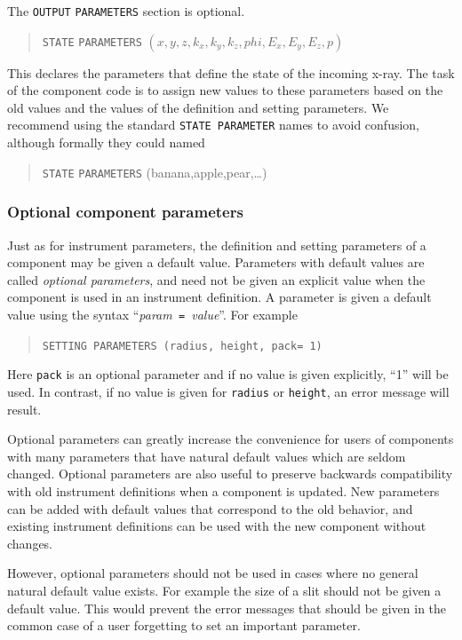 The \texttt{OUTPUT} \texttt{PARAMETERS} section is optional.

\begin{quote}
  \texttt{STATE} \texttt{PARAMETERS} $(x,y,z,k_x,k_y,k_z,phi,E_x,E_y,E_z,p)$
\end{quote}
This declares the parameters that define the state of the incoming
x-ray. The task of the component code is to assign new values to these
parameters based on the old values and the values of the definition and
setting parameters. 
We recommend using the standard \texttt{STATE PARAMETER} names to avoid confusion, although formally they could named
\begin{quote}
  \texttt{STATE} \texttt{PARAMETERS} (banana,apple,pear,\ldots)
\end{quote}

\subsubsection{Optional component parameters}

Just as for instrument parameters, the definition and setting parameters of a
component may be given a default value. Parameters with default values are
called \emph{optional parameters}, and need not be given an explicit value when
the component is used in an instrument definition. A parameter is given a
default value using the syntax ``\textit{param}\texttt{ = }\textit{value}''.
For example
\begin{quote}
  \texttt{SETTING PARAMETERS (radius, height, pack= 1)}
\end{quote}
Here \verb+pack+ is an optional parameter and if no value is given
explicitly, ``1'' will be used. In contrast, if no value is
  given for \texttt{radius} or \texttt{height}, an error message will
  result.

Optional parameters can greatly increase the convenience for users of
components with many parameters that have natural default values which
are seldom changed. Optional parameters are also useful to preserve
backwards compatibility with old instrument definitions when a component
is updated. New parameters can be added with default values that
correspond to the old behavior, and existing instrument definitions can
be used with the new component without changes.

However, optional parameters should not be used in cases where no
general natural default value exists. For example the size of a slit should not be given a default value. 
This would prevent the error messages that should be given in the common case of a
user forgetting to set an important parameter.


